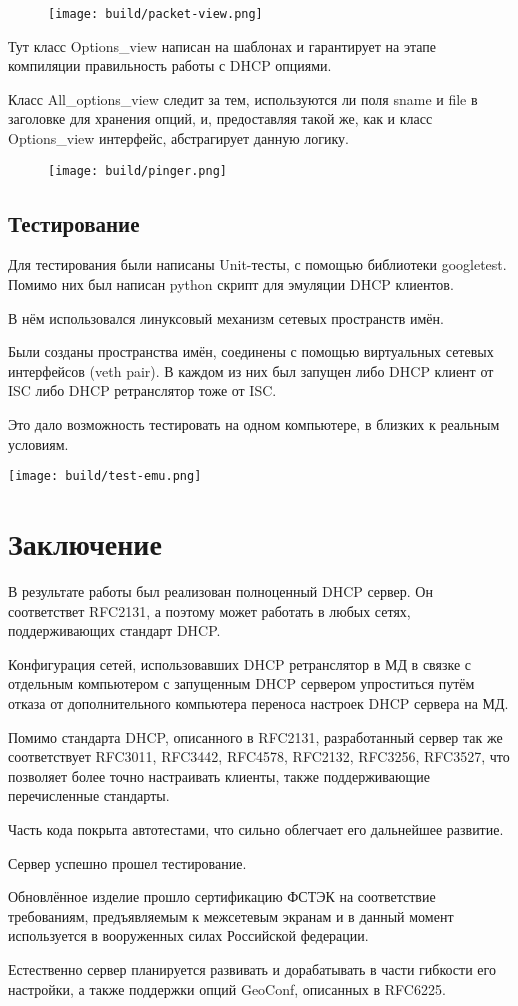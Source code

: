 \documentclass[12pt]{article}
\begin{document}
\begin{figure}[H]
    \texttt{[image: build/packet-view.png]}
    \caption{}
\end{figure}

Тут класс Options\_view написан на шаблонах и гарантирует на этапе компиляции правильность работы с DHCP опциями.

Класс All\_options\_view следит за тем, используются ли поля sname и file в заголовке для хранения опций, и, предоставляя такой же, как и класс Options\_view интерфейс, абстрагирует данную логику.

\begin{figure}[H]
    \texttt{[image: build/pinger.png]}
    \caption{}
\end{figure}

\pagebreak
\subsection{Тестирование}

Для тестирования были написаны Unit-тесты, с помощью библиотеки googletest.
Помимо них был написан python скрипт для эмуляции DHCP клиентов.

В нём использовался линуксовый механизм сетевых пространств имён.

Были созданы пространства имён, соединены с помощью виртуальных сетевых интерфейсов (veth pair). В каждом из них был запущен либо DHCP клиент от ISC либо DHCP ретранслятор тоже от ISC.

Это дало возможность тестировать на одном компьютере, в близких к реальным условиям.

\texttt{[image: build/test-emu.png]}

\pagebreak
\section{Заключение}

В результате работы был реализован полноценный DHCP сервер.
Он соответствет RFC2131, а поэтому может работать в любых сетях, поддерживающих стандарт DHCP.

Конфигурация сетей, использовавших DHCP ретранслятор в МД в связке с отдельным компьютером с запущенным DHCP сервером упроститься путём отказа от дополнительного компьютера переноса настроек DHCP сервера на МД.

Помимо стандарта DHCP, описанного в RFC2131, разработанный сервер так же соответствует RFC3011, RFC3442, RFC4578, RFC2132, RFC3256, RFC3527, что позволяет более точно настраивать клиенты, также поддерживающие перечисленные стандарты.

Часть кода покрыта автотестами, что сильно облегчает его дальнейшее развитие.

Сервер успешно прошел тестирование.

Обновлённое изделие прошло сертификацию ФСТЭК на соответствие требованиям, предъявляемым к межсетевым экранам и в данный момент используется в вооруженных силах Российской федерации.

Естественно сервер планируется развивать и дорабатывать в части гибкости его настройки, а также поддержки опций GeoConf, описанных в RFC6225.
\end{document}

